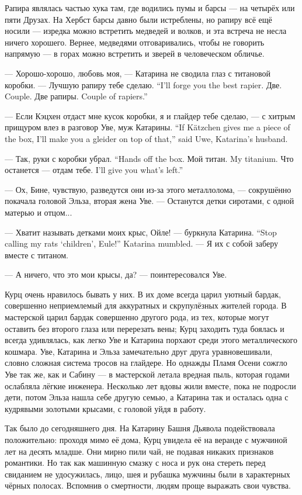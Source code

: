 Рапира являлась частью хука там, где водились пумы и барсы --- на четырёх или пяти Друзах.
На Хербст барсы давно были истреблены, но рапиру всё ещё носили --- изредка можно встретить медведей и волков, и эта встреча не несла ничего хорошего.
Вернее, медведями отговаривались, чтобы не говорить напрямую --- в горах можно встретить и зверей в человеческом обличье.

--- Хорошо-хорошо, любовь моя, --- Катарина не сводила глаз с титановой коробки.
{--- Лучшую рапиру тебе сделаю.}
{``I'll forge you the best rapier.}
{Две.}
{Couple.}
{Две рапиры.}
{Couple of rapiers.''}

{--- Если Кэцхен отдаст мне кусок коробки, я и глайдер тебе сделаю, --- с хитрым прищуром влез в разговор Уве, муж Катарины.}
{``If K\"{a}tzchen gives me a piece of the box, I'll make you a gleider on top of that,'' said Uwe, Katarina's husband.}

{--- Так, руки с коробки убрал.}
{``Hands off the box.}
{Мой титан.}
{My titanium.}
{Что останется --- отдам тебе.}
{I'll give you what's left.''}

--- Ох, Бине, чувствую, разведутся они из-за этого металлолома, --- сокрушённо покачала головой Эльза, вторая жена Уве.
--- Останутся детки сиротами, с одной матерью и отцом...

{--- Хватит называть детками моих крыс, Ойле! --- буркнула Катарина.}
{``Stop calling my rats `children', Eule!'' Katarina mumbled.}
--- Я их с собой заберу вместе с титаном.

--- А ничего, что это мои крысы, да? --- поинтересовался Уве.

Курц очень нравилось бывать у них.
В их доме всегда царил уютный бардак, совершенно неприемлемый для аккуратных и скрупулёзных жителей города.
В мастерской царил бардак совершенно другого рода, из тех, которые могут оставить без второго глаза или перерезать вены;
Курц заходить туда боялась и всегда удивлялась, как легко Уве и Катарина порхают среди этого металлического кошмара.
Уве, Катарина и Эльза замечательно друг друга уравновешивали, словно сложная система тросов на глайдере.
Но однажды Пламя Осени сожгло Уве так же, как и Сабину --- в мастерской летала вредная пыль, которая годами ослабляла лёгкие инженера.
Несколько лет вдовы жили вместе, пока не подросли дети, потом Эльза нашла себе другую семью, а Катарина так и осталась одна с кудрявыми золотыми крысами, с головой уйдя в работу.

Так было до сегодняшнего дня.
На Катарину Башня Дьявола подействовала положительно: проходя мимо её дома, Курц увидела её на веранде с мужчиной лет на десять младше.
Они мирно пили чай, не подавая никаких признаков романтики.
Но так как машинную смазку с носа и рук она стереть перед свиданием не удосужилась, лицо, шея и рубашка мужчины были в характерных чёрных полосах.
Вспомнив о смертности, людям проще выражать свои чувства.

